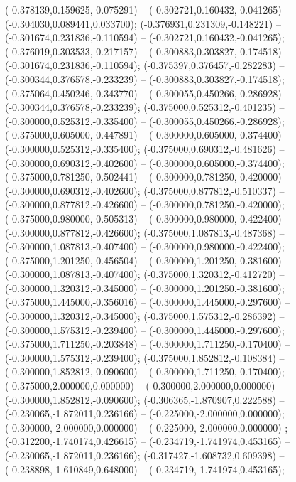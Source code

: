  (-0.378139,0.159625,-0.075291) -- (-0.302721,0.160432,-0.041265) -- (-0.304030,0.089441,0.033700);
 (-0.376931,0.231309,-0.148221) -- (-0.301674,0.231836,-0.110594) -- (-0.302721,0.160432,-0.041265);
 (-0.376019,0.303533,-0.217157) -- (-0.300883,0.303827,-0.174518) -- (-0.301674,0.231836,-0.110594);
 (-0.375397,0.376457,-0.282283) -- (-0.300344,0.376578,-0.233239) -- (-0.300883,0.303827,-0.174518);
 (-0.375064,0.450246,-0.343770) -- (-0.300055,0.450266,-0.286928) -- (-0.300344,0.376578,-0.233239);
 (-0.375000,0.525312,-0.401235) -- (-0.300000,0.525312,-0.335400) -- (-0.300055,0.450266,-0.286928);
 (-0.375000,0.605000,-0.447891) -- (-0.300000,0.605000,-0.374400) -- (-0.300000,0.525312,-0.335400);
 (-0.375000,0.690312,-0.481626) -- (-0.300000,0.690312,-0.402600) -- (-0.300000,0.605000,-0.374400);
 (-0.375000,0.781250,-0.502441) -- (-0.300000,0.781250,-0.420000) -- (-0.300000,0.690312,-0.402600);
 (-0.375000,0.877812,-0.510337) -- (-0.300000,0.877812,-0.426600) -- (-0.300000,0.781250,-0.420000);
 (-0.375000,0.980000,-0.505313) -- (-0.300000,0.980000,-0.422400) -- (-0.300000,0.877812,-0.426600);
 (-0.375000,1.087813,-0.487368) -- (-0.300000,1.087813,-0.407400) -- (-0.300000,0.980000,-0.422400);
 (-0.375000,1.201250,-0.456504) -- (-0.300000,1.201250,-0.381600) -- (-0.300000,1.087813,-0.407400);
 (-0.375000,1.320312,-0.412720) -- (-0.300000,1.320312,-0.345000) -- (-0.300000,1.201250,-0.381600);
 (-0.375000,1.445000,-0.356016) -- (-0.300000,1.445000,-0.297600) -- (-0.300000,1.320312,-0.345000);
 (-0.375000,1.575312,-0.286392) -- (-0.300000,1.575312,-0.239400) -- (-0.300000,1.445000,-0.297600);
 (-0.375000,1.711250,-0.203848) -- (-0.300000,1.711250,-0.170400) -- (-0.300000,1.575312,-0.239400);
 (-0.375000,1.852812,-0.108384) -- (-0.300000,1.852812,-0.090600) -- (-0.300000,1.711250,-0.170400);
 (-0.375000,2.000000,0.000000) -- (-0.300000,2.000000,0.000000) -- (-0.300000,1.852812,-0.090600);
 (-0.306365,-1.870907,0.222588) -- (-0.230065,-1.872011,0.236166) -- (-0.225000,-2.000000,0.000000);
 (-0.300000,-2.000000,0.000000) -- (-0.225000,-2.000000,0.000000) ;
 (-0.312200,-1.740174,0.426615) -- (-0.234719,-1.741974,0.453165) -- (-0.230065,-1.872011,0.236166);
 (-0.317427,-1.608732,0.609398) -- (-0.238898,-1.610849,0.648000) -- (-0.234719,-1.741974,0.453165);
